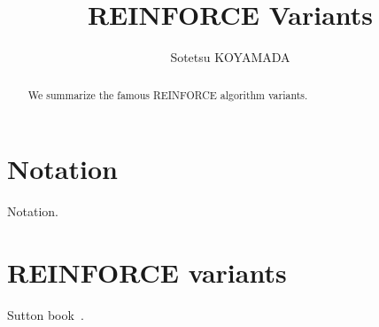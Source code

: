 \documentclass{article}
\title{REINFORCE Variants}
\author{
Sotetsu KOYAMADA
}
\begin{document}
\maketitle

\begin{abstract}
We summarize the famous REINFORCE algorithm variants.
\end{abstract}

\section{Notation}
Notation.

\section{REINFORCE variants}
Sutton book~\cite{Sutton2018-ij}.



\end{document}
